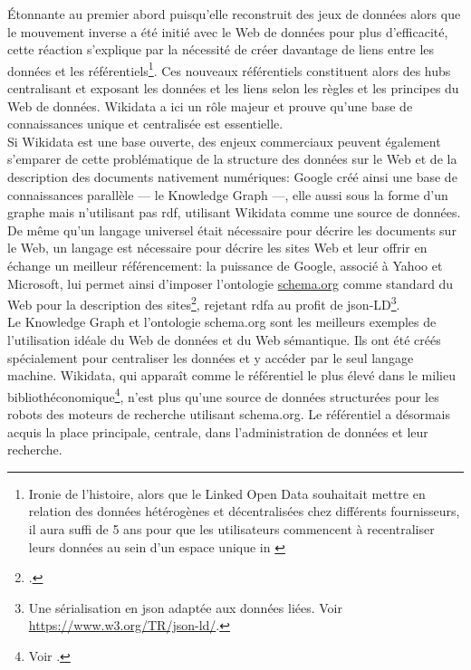 Étonnante au premier abord puisqu'elle reconstruit des jeux de données alors que le mouvement inverse a été initié avec le Web de données pour plus d'efficacité, cette réaction s'explique par la nécessité de créer davantage de liens entre les données et les référentiels\footnote{\og Ironie de l’histoire, alors que le Linked Open Data souhaitait mettre en relation des données hétérogènes et décentralisées chez différents fournisseurs, il aura suffi de 5 ans pour que les utilisateurs commencent à recentraliser leurs données au sein d’un espace unique\fg{} in \cite{poupeau_au-a_2018}}. Ces nouveaux référentiels constituent alors des \og hubs\fg{} centralisant et exposant les données et les liens selon les règles et les principes du Web de données. Wikidata a ici un rôle majeur et prouve qu'une base de connaissances unique et centralisée est essentielle.\\

Si Wikidata est une base ouverte, des enjeux commerciaux peuvent également s'emparer de cette problématique de la structure des données sur le Web et de la description des documents nativement numériques: Google créé ainsi une base de connaissances parallèle --- le Knowledge Graph ---, elle aussi sous la forme d'un graphe mais n'utilisant pas \ac{rdf}, utilisant Wikidata comme une source de données. De même qu'un langage universel était nécessaire pour décrire les documents sur le Web, un langage est nécessaire pour décrire les sites Web et leur offrir en échange un meilleur référencement: la puissance de Google, associé à Yahoo et Microsoft, lui permet ainsi d'imposer l'ontologie \href{https://www.schema.org}{schema.org} comme standard du Web pour la description des sites\footcite{poupeau_au-a_2018}, rejetant \ac{rdf}a au profit de \ac{json}-LD\footnote{Une sérialisation en \ac{json} adaptée aux données liées. Voir \url{https://www.w3.org/TR/json-ld/}.}.\\

Le Knowledge Graph et l'ontologie schema.org sont les meilleurs exemples de l'utilisation idéale du Web de données et du Web sémantique. Ils ont été créés spécialement pour centraliser les données et y accéder par le seul langage machine. Wikidata, qui apparaît comme le référentiel le plus élevé dans le milieu bibliothéconomique\footnote{Voir .}, n'est plus qu'une source de données structurées pour les robots des moteurs de recherche utilisant schema.org. Le référentiel a désormais acquis la place principale, centrale, dans l'administration de données et leur recherche.

